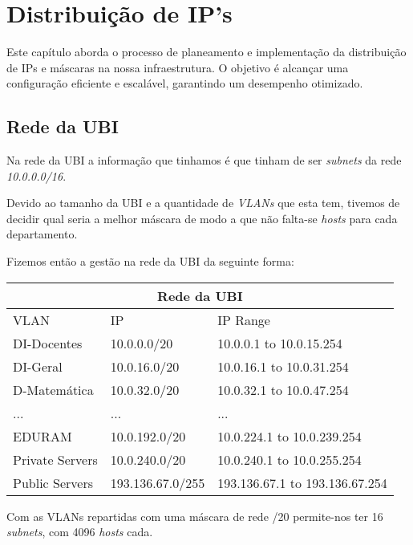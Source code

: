 \section{Distribuição de IP's}
\label{sec:distip}
Este capítulo aborda o processo de planeamento e implementação da distribuição
de IPs e máscaras na nossa infraestrutura. O objetivo é alcançar uma configuração eficiente e escalável,
garantindo um desempenho otimizado.

\subsection{Rede da UBI}
Na rede da UBI a informação que tinhamos é que tinham de ser \textit{subnets} da rede \textit{10.0.0.0/16}.

Devido ao tamanho da UBI e a quantidade de \textit{VLANs} que esta tem, tivemos de decidir qual
seria a melhor máscara de modo a que não falta-se \textit{hosts} para cada departamento.

Fizemos então a gestão na rede da UBI da seguinte forma:

\vspace{3mm}
\setlength{\tabcolsep}{20pt}
\renewcommand{\arraystretch}{1.5}
\noindent
\begin{tabular}{ |p{3cm}|p{3cm}|p{5cm}|}
  \hline
  \multicolumn{3}{|c|}{Rede da UBI}                                         \\
  \hline
  VLAN            & IP               & IP Range                             \\
  \hline
  DI-Docentes     & 10.0.0.0/20      & 10.0.0.1 to 10.0.15.254              \\
  DI-Geral        & 10.0.16.0/20     & 10.0.16.1 to 10.0.31.254             \\
  D-Matemática    & 10.0.32.0/20     & 10.0.32.1 to 10.0.47.254             \\
  ...             & ...              & ...                                  \\
  EDURAM          & 10.0.192.0/20    & 10.0.224.1 to 10.0.239.254           \\
  Private Servers & 10.0.240.0/20    & 10.0.240.1 to 10.0.255.254           \\
  Public Servers  & 193.136.67.0/255 & \small193.136.67.1 to 193.136.67.254 \\
  \hline
\end{tabular}
\vspace{2mm}

Com as VLANs repartidas com uma máscara de rede /20 permite-nos ter 16 \textit{subnets}, com 4096 \textit{hosts} cada. \\

